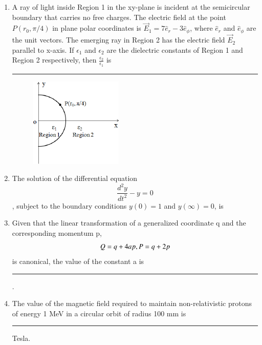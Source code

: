 \documentclass[journal,12pt,onecolumn]{IEEEtran}
\theoremstyle{remark}
\begin{document}
\begin{enumerate}
\item A ray of light inside Region 1 in the xy-plane is incident at the semicircular boundary that carries no free charges. The electric field at the point $P(r_0, \pi/4)$ in plane polar coordinates is $\vec{E}_1 = 7\hat{e}_r - 3\hat{e}_\phi$, where $\hat{e}_r$ and $\hat{e}_\phi$ are the unit vectors. The emerging ray in Region 2 has the electric field $\vec{E}_2$ parallel to x-axis. If $\epsilon_1$ and $\epsilon_2$ are the dielectric constants of Region 1 and Region 2 respectively, then $\frac{\epsilon_2}{\epsilon_1}$ is \rule{5cm}{0.4pt}
\hfill{}
\begin{figure}[H]
\centering
 \caption*{} \label{fig:46} \includegraphics{figs/q46.png}
\end{figure}
\item The solution of the differential equation $$\frac{d^2y}{dt^2} - y = 0$$, subject to the boundary conditions $y(0)=1$ and $y(\infty)=0$, is
\hfill{} \begin{enumerate}  \end{enumerate}

\item Given that the linear transformation of a generalized coordinate q and the corresponding momentum p, $$Q = q + 4ap, \\P = q + 2p$$ is canonical, the value of the constant a is \rule{3cm}{0.4pt}.\hfill{}

\item The value of the magnetic field required to maintain non-relativistic protons of energy 1 MeV in a circular orbit of radius 100 mm is \rule{4cm}{0.4pt} Tesla. \hfill{}


\end{enumerate}
\end{document}
